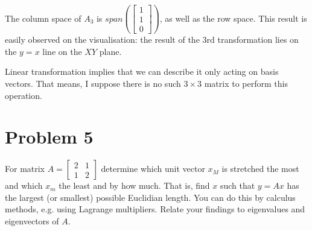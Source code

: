 \documentclass[letterpaper,10pt,english]{jupyterBook}
\begin{document}
\sphinxAtStartPar
The column space of \(A_3\) is \(span(
\begin{bmatrix}
1\\
1\\
0
\end{bmatrix})\), as well as the row space. This result is easily observed on the visualisation: the result of the 3rd transformation lies on the \(y = x\) line on the \(XY\) plane.

\begin{sphinxVerbatim}[commandchars=\\\{\}]
  
       
    
\end{sphinxVerbatim}

\sphinxAtStartPar
{}
Linear transformation implies that we can describe it only acting on basis vectors.
That means, I suppose there is no such \(3\times 3\) matrix to perform this operation.


\section{Problem 5}
\label{\detokenize{notebooks/ProblemSet1:problem-5}}
\sphinxAtStartPar
For matrix
\(A=
\begin{bmatrix}
2 & 1\\
1 & 2
\end{bmatrix}
\)
determine which unit vector \(x_M\) is stretched the most and which \(x_m\) the least and by how much. That is, find \(x\) such that \(y=Ax\) has the largest (or smallest) possible Euclidian length. You can do this by calculus methods, e.g. using Lagrange multipliers. Relate your findings to eigenvalues and eigenvectors of \(A\).
\end{document}
